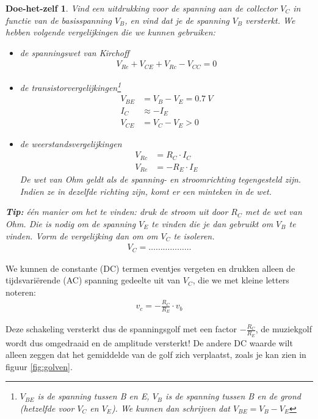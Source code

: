 \documentclass{article}
\newtheorem{DIY}{Doe-het-zelf}
\begin{document}
				\begin{DIY} Vind een uitdrukking voor de spanning aan de collector $V_C$ in functie van de basisspanning $V_B$, en vind dat je de spanning $V_B$ versterkt. We hebben volgende vergelijkingen die we kunnen gebruiken:
				\begin{itemize}
					\item de spanningswet van Kirchoff
					\begin{align}
					V_{Re} + V_{CE} + V_{Rc} - V_{CC} = 0    
					\end{align}
					\item de transistorvergelijkingen\footnote{ $V_{BE}$  is de spanning tussen B en E, $V_{B}$ is de spanning tussen B en de grond (hetzelfde voor $V_C$ en $V_E$). We kunnen dan schrijven dat $ V_{BE} = V_{B} - V_{E} $}
					\begin{align}
				    V_{BE} &= V_{B} - V_{E} = 0.7~V \\
				     I_C&\approx -I_E \\
				    V_{CE} &= V_C - V_E > 0
					\end{align}
					\item de weerstandsvergelijkingen
					\begin{align}
				   	V_{Rc} &= R_C \cdot I_C \\
				   	V_{Re} &= - R_E \cdot  I_E
					\end{align}
					De wet van Ohm geldt als de spanning- en stroomrichting tegengesteld zijn. Indien ze in dezelfde richting zijn, komt er een minteken in de wet.
				\end{itemize}

				\textbf{Tip:} \'e\'en manier om het te vinden: druk de stroom uit door $R_C$ met de wet van Ohm. Die is nodig om de spanning $V_E$ te vinden die je dan gebruikt om $V_B$ te vinden. Vorm de vergelijking dan om om $V_C$ te isoleren.
				\begin{align}
				    V_C = \ldots \ldots \ldots \ldots  \ldots  \ldots 
				\end{align}
				\end{DIY}
				We kunnen de constante (DC) termen eventjes vergeten en drukken alleen de tijdsvari\"erende (AC) spanning gedeelte uit van $V_C$, die we met kleine letters noteren:
				\begin{align}
				    v_c = - \frac{R_C}{R_E} \cdot v_b
				\end{align}

				Deze schakeling versterkt dus de spanningsgolf met een factor $- \frac{R_C}{R_E}$, de muziekgolf wordt dus omgedraaid en de amplitude versterkt! De andere DC waarde wilt alleen zeggen dat het gemiddelde van de golf zich verplaatst, zoals je kan zien in figuur \ref{fig:golven}.
\end{document}
